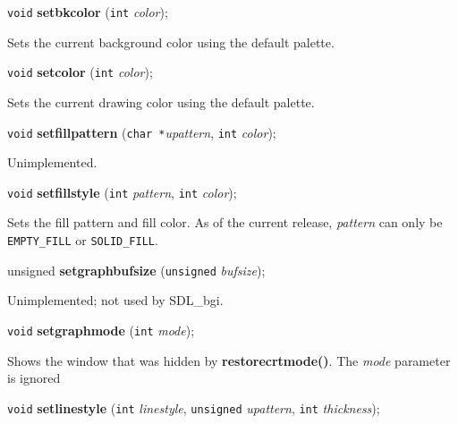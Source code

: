\documentclass[a4paper,11pt]{article}
\newcommand{\SDLbgi}{SDL\_bgi}
\newcommand{\V}{\texttt{void}}      %
\newcommand{\I}{\texttt{int}}       %
\newcommand{\C}{\texttt{char *}}    %
\newcommand{\func}[1]{\textbf{#1}}  %
\newcommand{\A}[1]{\emph{#1}}       %
\newcommand{\T}[1]{\texttt{#1}}     %
\newenvironment{bgi}
{ %
  \begin{snugshade}
}
{ %
  \end{snugshade}
}
\begin{document}

\begin{bgi}
\V{} \func{setbkcolor} (\I{} \A{color});
\end{bgi}

Sets the current background color using the default palette.


\begin{bgi}
\V{} \func{setcolor} (\I{} \A{color});
\end{bgi}

Sets the current drawing color using the default palette.


\begin{bgi}
\V{} \func{setfillpattern} (\C{}\A{upattern}, \I{} \A{color}); 
\end{bgi}

Unimplemented.



\begin{bgi}
\V{} \func{setfillstyle} (\I{} \A{pattern}, \I{} \A{color}); 
\end{bgi}

Sets the fill pattern and fill color. As of the current release,
\A{pattern} can only be \T{EMPTY\_FILL} or \T{SOLID\-\_FILL}.


\begin{bgi}
unsigned \func{setgraphbufsize} (\texttt{unsigned} \A{bufsize}); 
\end{bgi}

Unimplemented; not used by \SDLbgi.


\begin{bgi}
\V{} \func{setgraphmode} (\I{} \A{mode}); 
\end{bgi}

Shows the window that was hidden by \func{restorecrtmode()}. The
\A{mode} parameter is ignored


\begin{bgi}
\V{} \func{setlinestyle} (\I{} \A{linestyle}, \texttt{unsigned}
\A{upattern}, \I{} \A{thickness});
\end{bgi}
\end{document}
